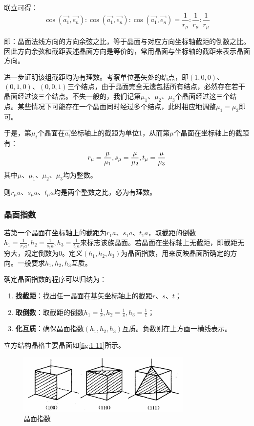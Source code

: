     联立可得：
    \[
        \cos (\vec{a_1}, \vec{e_n}) : \cos (\vec{a_1}, \vec{e_n}) : \cos (\vec{a_1}, \vec{e_n}) = \frac{1}{r_\mu} : \frac{1}{r_\mu} : \frac{1}{r_\mu}
    \]

    即：晶面法线方向的方向余弦之比，等于晶面与对应方向坐标轴截距的倒数之比。因此方向余弦和截距表述晶面方向是等价的，常用晶面与坐标轴的截距来表示晶面方向。

    进一步证明该组截距均为有理数。考察单位基矢处的结点，即$(1,0,0)$、$(0,1,0)$、$(0,0,1)$三个结点，由于晶面完全无遗包括所有结点，必然存在若干晶面经过该三个结点。不失一般的，我们记第$\mu_1$、$\mu_2$、$\mu_3$个晶面经过这三个结点。某些情况下可能存在一个晶面同时经过多个结点，此时相应地调整$\mu_1=\mu_2$即可。

    于是，第$\mu_i$个晶面在$\vec{a_i}$坐标轴上的截距为单位1，从而第$\mu$个晶面在坐标轴上的截距有：
    \[
        r_\mu = \frac{\mu}{\mu_1}, \\
        s_\mu = \frac{\mu}{\mu_2}, \\
        t_\mu = \frac{\mu}{\mu_3}
    \]
    其中$\mu$、$\mu_1$、$\mu_2$、$\mu_3$均为整数。
    
    则$r_\mu a$、$s_\mu a$、$t_\mu a$均是两个整数之比，必为有理数。

\subsubsection{晶面指数}
    若第一个晶面在坐标轴上的截距为$r_1 a$、$s_1 a$、$t_1 a$，取截距的倒数$h_1 = \frac{1}{r_1 a}, h_2 = \frac{1}{s_1 a}, h_3 = \frac{1}{t_1 a}$来标志该族晶面。若晶面在坐标轴上无截距，即截距无穷大，规定倒数为0。定义$(h_1, h_2, h_3)$为晶面指数，用来反映晶面所确定的方向。一般要求$h_1, h_2, h_3$互质。

    确定晶面指数的程序可以归纳为：
    \begin{enumerate}[itemsep=0pt,parsep=0pt]
        \item \textbf{找截距}：找出任一晶面在基矢坐标轴上的截距$r$、$s$、$t$；
        \item \textbf{取倒数}：取截距的倒数$h_1 = \frac{1}{r}, h_2 = \frac{1}{s}, h_3 = \frac{1}{t}$；
        \item \textbf{化互质}：确保晶面指数$(h_1, h_2, h_3)$互质。负数则在上方画一横线表示。
    \end{enumerate}

    立方结构晶格主要晶面如\autoref{fig:1-11}所示。

    \begin{figure}[!htbp]
        \centering    
        \includegraphics[height=8em, keepaspectratio=true]{pic/1-35}
        \caption{晶面指数}
        \label{fig:1-11}
    \end{figure}

